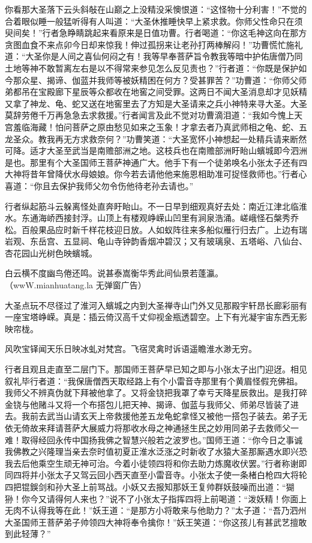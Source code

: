 \documentclass[12pt,UTF8]{ctexbook}
\begin{document}
你看那大圣落下云头斜敧在山巅之上没精没采懊恨道：“这怪物十分利害！”不觉的合着眼似睡一般猛听得有人叫道：“大圣休推睡快早上紧求救。你师父性命只在须臾间矣！”行者急睁睛跳起来看原来是日值功曹。行者喝道：“你这毛神这向在那方贪图血食不来点卯今日却来惊我！伸过孤拐来让老孙打两棒解闷！”功曹慌忙施礼道：“大圣你是人间之喜仙何闷之有！我等早奉菩萨旨令教我等暗中护佑唐僧乃同土地等神不敢暂离左右是以不得常来参见怎么反见责也？”行者道：“你既是保护如今那众星、揭谛、伽蓝并我师等被妖精困在何方？受甚罪苦？”功曹道：“你师父师弟都吊在宝殿廊下星辰等众都收在地窖之间受罪。这两日不闻大圣消息却才见妖精又拿了神龙、龟、蛇又送在地窖里去了方知是大圣请来之兵小神特来寻大圣。大圣莫辞劳倦千万再急急去求救援。”行者闻言及此不觉对功曹滴泪道：“我如今愧上天宫羞临海藏！怕问菩萨之原由愁见如来之玉象！才拿去者乃真武师相之龟、蛇、五龙圣众。教我再无方求救奈何？”功曹笑道：“大圣宽怀小神想起一处精兵请来断然可降。适才大圣至武当是南赡部洲之地。这枝兵也在南赡部洲盱眙山蠙城即今泗洲是也。那里有个大圣国师王菩萨神通广大。他手下有一个徒弟唤名小张太子还有四大神将昔年曾降伏水母娘娘。你今若去请他他来施恩相助准可捉怪救师也。”行者心喜道：“你且去保护我师父勿令伤他待老孙去请也。”

行者纵起筋斗云躲离怪处直奔盱眙山。不一日早到细观真好去处：南近江津北临淮水。东通海峤西接封浮。山顶上有楼观峥嵘山凹里有涧泉浩涌。嵯峨怪石槃秀乔松。百般果品应时新千样花枝迎日放。人如蚁阵往来多船似雁行归去广。上边有瑞岩观、东岳宫、五显祠、龟山寺钟韵香烟冲碧汉；又有玻璃泉、五塔峪、八仙台、杏花园山光树色映蠙城。

白云横不度幽鸟倦还鸣。说甚泰嵩衡华秀此间仙景若蓬瀛。（wwW.mianhuatang.la 无弹窗广告）

大圣点玩不尽径过了淮河入蠙城之内到大圣禅寺山门外又见那殿宇轩昂长廊彩丽有一座宝塔峥嵘。真是：插云倚汉高千丈仰视金瓶透碧空。上下有光凝宇宙东西无影映帘栊。

风吹宝铎闻天乐日映冰虬对梵宫。飞宿灵禽时诉语遥瞻淮水渺无穷。

行者且观且走直至二层门下。那国师王菩萨早已知之即与小张太子出门迎迓。相见叙礼毕行者道：“我保唐僧西天取经路上有个小雷音寺那里有个黄眉怪假充佛祖。我师父不辨真伪就下拜被他拿了。又将金铙把我罩了幸亏天降星辰救出。是我打碎金铙与他赌斗又将一个布搭包儿把天神、揭谛、伽蓝与我师父、师弟尽皆装了进去。我前去武当山请玄天上帝救援他差五龙龟蛇拿怪又被他一搭包子装去。弟子无依无倚故来拜请菩萨大展威力将那收水母之神通拯生民之妙用同弟子去救师父一难！取得经回永传中国扬我佛之智慧兴般若之波罗也。”国师王道：“你今日之事诚我佛教之兴隆理当亲去奈时值初夏正淮水泛涨之时新收了水猿大圣那厮遇水即兴恐我去后他乘空生顽无神可治。今着小徒领四将和你去助力炼魔收伏罢。”行者称谢即同四将并小张太子又驾云回小西天直至小雷音寺。小张太子使一条楮白枪四大将轮四把锟鋘剑和孙大圣上前骂战。小妖又去报知那妖王复帅群妖鼓噪而出道：“猢狲！你今又请得何人来也？”说不了小张太子指挥四将上前喝道：“泼妖精！你面上无肉不认得我等在此！”妖王道：“是那方小将敢来与他助力？”太子道：“吾乃泗州大圣国师王菩萨弟子帅领四大神将奉令擒你！”妖王笑道：“你这孩儿有甚武艺擅敢到此轻薄？”
\end{document}
